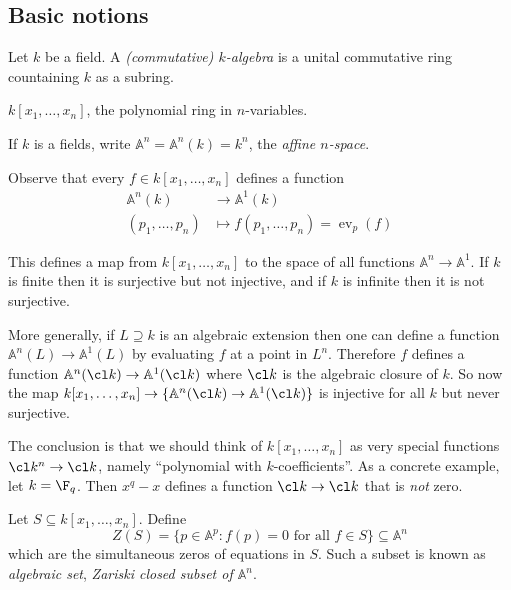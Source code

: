 \documentclass[a4paper]{article}
\renewcommand{\A}{\mathbb{A}}
\DeclareMathOperator{\ev}{ev}
\begin{document}
\subsection{Basic notions}

\begin{definition}[\(k\)-algebra]
  Let \(k\) be a field. A \emph{(commutative) \(k\)-algebra} is a unital commutative ring countaining \(k\) as a subring.
\end{definition}

\begin{eg}
  \(k[x_1, \dots, x_n]\), the polynomial ring in \(n\)-variables.
\end{eg}

\begin{notation}
  If \(k\) is a fields, write \(\A^n = \A^n(k) = k^n\), the \emph{affine \(n\)-space}.
\end{notation}

Observe that every \(f \in k[x_1, \dots, x_n]\) defines a function
\begin{align*}
  \A^n(k) &\to \A^1(k) \\
  (p_1, \dots, p_n) &\mapsto f(p_1, \dots, p_n) = \ev_p(f)
\end{align*}

This defines a map from \(k[x_1, \dots, x_n]\) to the space of all functions \(\A^n \to \A^1\). If \(k\) is finite then it is surjective but not injective, and if \(k\) is infinite then it is not surjective.

More generally, if \(L \supseteq k\) is an algebraic extension then one can define a function \(\A^n(L) \to \A^1(L)\) by evaluating \(f\) at a point in \(L^n\). Therefore \(f\) defines a function \(\A^n(\cl k) \to \A^1(\cl k)\) where \(\cl k\) is the algebraic closure of \(k\). So now the map \(k[x_1, \dots, x_n] \to \{\A^n(\cl k) \to \A^1(\cl k)\}\) is injective for all \(k\) but never surjective.

The conclusion is that we should think of \(k[x_1, \dots, x_n]\) as very special functions \(\cl k^n \to \cl k\), namely ``polynomial with \(k\)-coefficients''. As a concrete example, let \(k = \F_q\). Then \(x^q - x\) defines a function \(\cl k \to \cl k\) that is \emph{not} zero.

\begin{definition}
  Let \(S \subseteq k[x_1, \dots, x_n]\). Define
  \[
    Z(S) = \{p \in \A^p: f(p) = 0 \text{ for all } f \in S\} \subseteq \A^n
  \]
  which are the simultaneous zeros of equations in \(S\). Such a subset is known as \emph{algebraic set}, \emph{Zariski closed subset of \(\A^n\)}.
\end{definition}
\end{document}
